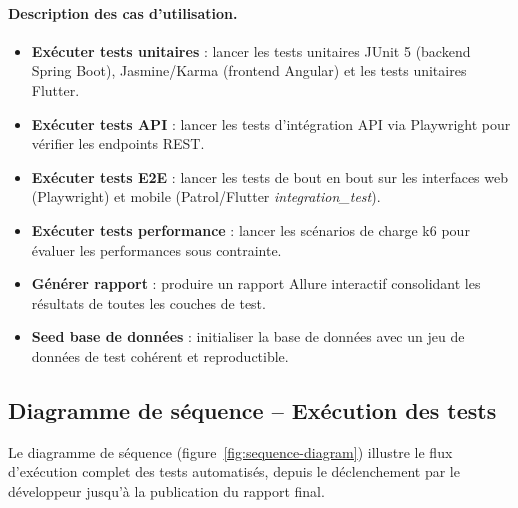 \paragraph{Description des cas d'utilisation.}
\begin{itemize}[nosep]
    \item \textbf{Exécuter tests unitaires} : lancer les tests unitaires JUnit 5 (backend Spring Boot), Jasmine/Karma (frontend Angular) et les tests unitaires Flutter.
    \item \textbf{Exécuter tests API} : lancer les tests d'intégration API via Playwright pour vérifier les endpoints REST.
    \item \textbf{Exécuter tests E2E} : lancer les tests de bout en bout sur les interfaces web (Playwright) et mobile (Patrol/Flutter \textit{integration\_test}).
    \item \textbf{Exécuter tests performance} : lancer les scénarios de charge k6 pour évaluer les performances sous contrainte.
    \item \textbf{Générer rapport} : produire un rapport Allure interactif consolidant les résultats de toutes les couches de test.
    \item \textbf{Seed base de données} : initialiser la base de données avec un jeu de données de test cohérent et reproductible.
\end{itemize}

\subsection{Diagramme de séquence -- Exécution des tests}
\label{subsec:diag-sequence}

Le diagramme de séquence (figure~\ref{fig:sequence-diagram}) illustre le flux d'exécution complet des tests automatisés, depuis le déclenchement par le développeur jusqu'à la publication du rapport final.

